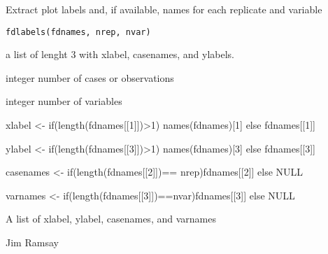 \begin{Description}\relax
Extract plot labels and, if available, names for each replicate and
variable
\end{Description}
\begin{Usage}
\begin{verbatim}
fdlabels(fdnames, nrep, nvar) 
\end{verbatim}
\end{Usage}
\begin{Arguments}
\begin{ldescription}
\item[\code{fdnames}] a list of lenght 3 with xlabel, casenames, and ylabels.  

\item[\code{nrep}] integer number of cases or observations 
\item[\code{nvar}] integer number of variables 
\end{ldescription}
\end{Arguments}
\begin{Details}\relax
xlabel <- if(length(fdnames[[1]])>1) names(fdnames)[1] else 
fdnames[[1]] 

ylabel <- if(length(fdnames[[3]])>1) names(fdnames)[3] else
fdnames[[3]] 

casenames <- if(length(fdnames[[2]])== nrep)fdnames[[2]] else NULL

varnames <- if(length(fdnames[[3]])==nvar)fdnames[[3]] else NULL
\end{Details}
\begin{Value}
A list of xlabel, ylabel, casenames, and varnames
\end{Value}
\begin{Author}\relax
Jim Ramsay
\end{Author}
\begin{SeeAlso}\relax
{}
\end{SeeAlso}

